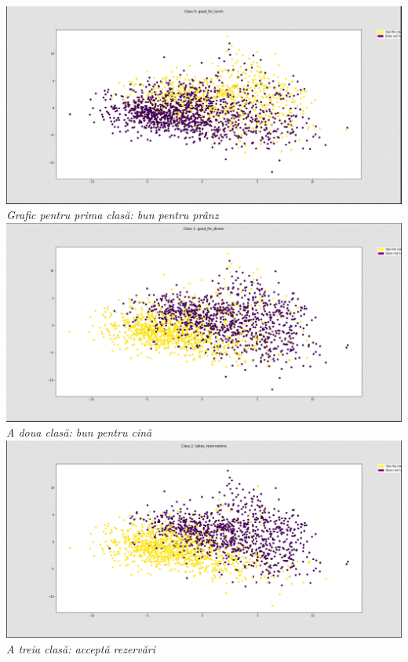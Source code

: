 \begin{center}
\includegraphics[scale=0.4]{class0} \\
\textit{Grafic pentru prima clasă: bun pentru prânz} \\

\includegraphics[scale=0.4]{class1} \\
\textit{A doua clasă: bun pentru cină} \\

\includegraphics[scale=0.4]{class2} \\ 
\textit{A treia clasă: acceptă rezervări} \\ 


\end{center}
